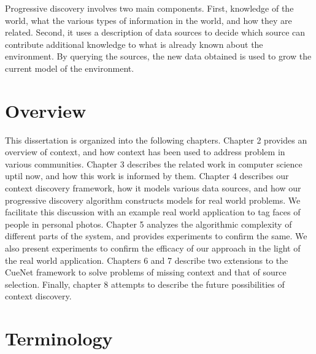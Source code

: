Progressive discovery involves two main components. First, knowledge of the world, what the various types of information in the world, and how they are related. Second, it uses a description of data sources to decide which source can contribute additional knowledge to what is already known about the environment. By querying the sources, the new data obtained is used to grow the current model of the environment. 


\section{Overview}
This dissertation is organized into the following chapters. Chapter 2 provides an overview of context, and how context has been used to address problem in various communities. Chapter 3 describes the related work in computer science uptil now, and how this work is informed by them. Chapter 4 describes our context discovery framework, how it models various data sources, and how our progressive discovery algorithm constructs models for real world problems. We facilitate this discussion with an example real world application to tag faces of people in personal photos. Chapter 5 analyzes the algorithmic complexity of different parts of the system, and provides experiments to confirm the same. We also present experiments to confirm the efficacy of our approach in the light of the real world application. Chapters 6 and 7 describe two extensions to the CueNet framework to solve problems of missing context and that of source selection. Finally, chapter 8 attempts to describe the future possibilities of context discovery.

\section{Terminology}
